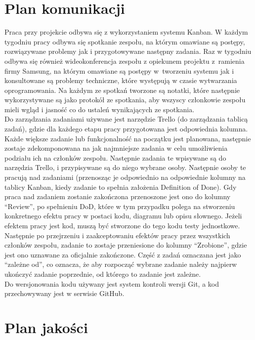 \documentclass{article}
\begin{document}
\section{Plan komunikacji}
Praca przy projekcie odbywa się z wykorzystaniem systemu Kanban. W każdym tygodniu pracy odbywa się spotkanie zespołu, na którym omawiane są postępy, rozwiązywane problemy jak i przygotowywane następny zadania. Raz w tygodniu odbywa się również wideokonferencja zespołu z opiekunem projektu z~ramienia firmy Samsung, na którym omawiane są postępy w~tworzeniu systemu jak i konsultowane są problemy techniczne, które występują w czasie wytwarzania oprogramowania. 
Na każdym ze spotkań tworzone są notatki, które następnie wykorzystywane są jako protokół ze spotkania, aby wszyscy członkowie zespołu mieli wgląd i jasność co do ustaleń wynikających ze spotkania. \mbox{}\\
Do zarządzania zadaniami \nobreak używane jest narzędzie Trello (do zarządzania tablicą zadań), gdzie dla każdego etapu pracy przygotowana jest \nobreak odpowiednia kolumna. Każde większe zadanie lub funkcjonalność na początku jest planowana, następnie zostaje zdekomponowana na jak najmniejsze zadania w celu umożliwienia podziału ich na członków zespołu. \nobreak Następnie zadania te wpisywane są do narzędzia Trello, i przypisywane są do niego wybrane osoby. Następnie osoby te pracują nad zadaniami (przenosząc je odpowiednio na odpowiednie kolumny na tablicy Kanban, kiedy zadanie to spełnia założenia Definition of Done). Gdy praca nad zadaniem zostanie zakończona przenoszone jest ono do kolumny “Review”, po spełnieniu DoD, które w tym przypadku polega na stworzeniu konkretnego efektu pracy w postaci kodu, diagramu lub opisu słownego. Jeżeli efektem pracy jest kod, muszą być stworzone do tego kodu testy jednostkowe. Następnie po przejrzeniu i zaakceptowaniu efektów pracy przez wszystkich członków zespołu, zadanie to zostaje przeniesione do kolumny “Zrobione”, gdzie jest ono uznawane za oficjalnie zakończone. Część z zadań oznaczana jest jako “zależne od”, co oznacza, że aby rozpocząć wybrane zadanie należy najpierw ukończyć zadanie poprzednie, od którego to zadanie jest zależne. \\
Do wersjonowania kodu używany jest system kontroli wersji Git, a kod przechowywany jest w serwisie GitHub.

\section{Plan jakości}
\end{document}
